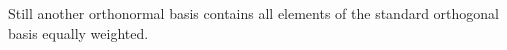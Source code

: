 %
%
%
%
Still another orthonormal basis
contains
all elements of the standard  orthogonal basis  equally weighted.
